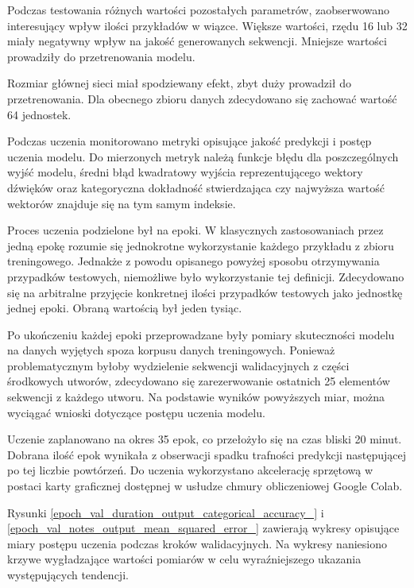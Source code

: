 {{        %

        Podczas testowania różnych wartości pozostałych parametrów, zaobserwowano interesujący wpływ ilości przykładów w wiązce.
        Większe wartości, rzędu 16 lub 32 miały negatywny wpływ na jakość generowanych sekwencji. 
        Mniejsze wartości prowadziły do przetrenowania modelu.

        Rozmiar głównej sieci miał spodziewany efekt, zbyt duży prowadził do przetrenowania. Dla obecnego
        zbioru danych zdecydowano się zachować wartość 64 jednostek.


        Podczas uczenia monitorowano metryki opisujące jakość predykcji i postęp uczenia modelu.
        Do mierzonych metryk należą funkcje błędu dla poszczególnych wyjść modelu, średni błąd kwadratowy
        wyjścia reprezentującego wektory dźwięków oraz kategoryczna dokładność stwierdzająca czy najwyższa wartość
        wektorów znajduje się na tym samym indeksie.
        
        Proces uczenia podzielone był na epoki. W klasycznych zastosowaniach przez jedną epokę rozumie się jednokrotne
        wykorzystanie każdego przykładu z zbioru treningowego. Jednakże z powodu opisanego powyżej sposobu otrzymywania
        przypadków testowych, niemożliwe było wykorzystanie tej definicji. Zdecydowano się na arbitralne przyjęcie konkretnej 
        ilości przypadków testowych jako jednostkę jednej epoki. Obraną wartością był jeden tysiąc.

        Po ukończeniu każdej epoki przeprowadzane były pomiary skuteczności modelu na danych wyjętych spoza korpusu 
        danych treningowych. Ponieważ problematycznym byłoby wydzielenie sekwencji walidacyjnych z części środkowych
        utworów, zdecydowano się zarezerwowanie ostatnich 25 elementów sekwencji z każdego utworu.
        Na podstawie wyników powyższych miar, można wyciągać wnioski dotyczące postępu uczenia modelu.

        Uczenie zaplanowano na okres 35 epok, co przełożyło się na czas bliski 20 minut. Dobrana ilość epok wynikała 
        z obserwacji spadku trafności predykcji następującej po tej liczbie powtórzeń. Do uczenia wykorzystano
        akcelerację sprzętową w postaci karty graficznej dostępnej w usłudze chmury obliczeniowej Google Colab.

        Rysunki \ref{epoch_val_duration_output_categorical_accuracy_} i \ref{epoch_val_notes_output_mean_squared_error_} zawierają wykresy opisujące miary postępu uczenia podczas kroków walidacyjnych. Na wykresy naniesiono krzywe wygładzające wartości pomiarów w celu wyraźniejszego ukazania występujących tendencji.

}}
